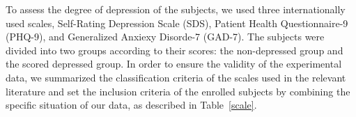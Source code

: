 \documentclass[10pt,twocolumn,letterpaper]{article}
\begin{document}
To assess the degree of depression of the subjects, we used three internationally used scales, Self-Rating Depression Scale (SDS), Patient Health Questionnaire-9 (PHQ-9), and Generalized Anxiexy Disorde-7 (GAD-7). The subjects were divided into two groups according to their scores: the non-depressed group and the scored depressed group. In order to ensure the validity of the experimental data, we summarized the classification criteria of the scales used in the relevant literature and set the inclusion criteria of the enrolled subjects by combining the specific situation of our data, as described in Table~\ref{scale}.



\begin{table}[]
\caption{The scoring criteria of the selected subjects}
\label{scale}
\end{table}
\end{document}
